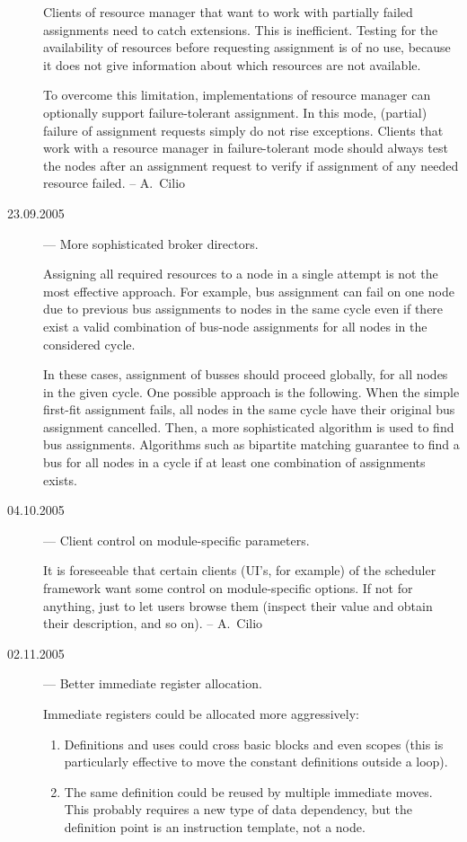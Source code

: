 \documentclass[a4paper,twoside]{tce}
\begin{document}
\begin{description}
  Clients of resource manager that want to work with partially failed
  assignments need to catch extensions. This is inefficient. Testing for the
  availability of resources before requesting assignment is of no use,
  because it does not give information about which resources are not
  available.

  To overcome this limitation, implementations of resource manager can
  optionally support failure-tolerant assignment. In this mode, (partial)
  failure of assignment requests simply do not rise exceptions. Clients that
  work with a resource manager in failure-tolerant mode should always test
  the nodes after an assignment request to verify if assignment of any
  needed resource failed.
%
  -- A.~Cilio
\item[23.09.2005] --- More sophisticated broker directors.

  Assigning all required resources to a node in a single attempt is not the
  most effective approach. For example, bus assignment can fail on one node
  due to previous bus assignments to nodes in the same cycle even if there
  exist a valid combination of bus-node assignments for all nodes in the
  considered cycle.

  In these cases, assignment of busses should proceed globally, for all
  nodes in the given cycle. One possible approach is the following. When the
  simple first-fit assignment fails, all nodes in the same cycle have their
  original bus assignment cancelled. Then, a more sophisticated algorithm is
  used to find bus assignments. Algorithms such as bipartite matching
  guarantee to find a bus for all nodes in a cycle if at least one
  combination of assignments exists.

\item[04.10.2005] --- Client control on module-specific parameters.

  It is foreseeable that certain clients (UI's, for example) of the
  scheduler framework want some control on module-specific options. If not
  for anything, just to let users browse them (inspect their value and
  obtain their description, and so on).
%
  -- A.~Cilio

\item[02.11.2005] --- Better immediate register allocation.

  Immediate registers could be allocated more aggressively:
  \begin{enumerate}
  \item %
    Definitions and uses could cross basic blocks and even scopes (this is
    particularly effective to move the constant definitions outside a loop).
  \item %
    The same definition could be reused by multiple immediate moves. This
    probably requires a new type of data dependency, but the definition
    point is an instruction template, not a node.
  \end{enumerate}


\end{description}
\end{document}
